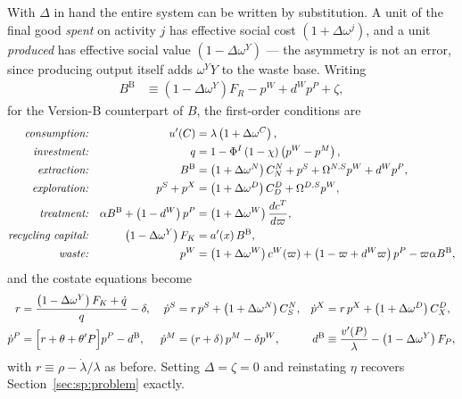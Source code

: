  With $\Delta$ in hand the entire system can be written by substitution.
A unit of the final good \emph{spent} on activity $j$ has effective social cost
$\left(1+\Delta\omega^j\right)$, and a unit \emph{produced} has effective social value
$\left(1-\Delta\omega^Y\right)$ --- the asymmetry is not an error, since producing output itself adds
$\omega^YY$ to the waste base. Writing
\begin{align}
B^{\mathrm B} &\equiv \left(1-\Delta\omega^Y\right)F_R-p^W+d^Wp^P+\zeta,
\label{eq:sp:versions:B-value}
\end{align}
for the Version-B counterpart of $B$, the first-order conditions are
\begin{align}
\text{\emph{consumption:}}
&&
u'\!\left(C\right) &= \lambda\left(1+\Delta\omega^C\right),
\label{eq:sp:versions:foc:C}
\\
\text{\emph{investment:}}
&&
q &= 1-\Phi^I\left(1-\chi\right)\left(p^W-p^M\right),
\label{eq:sp:versions:foc:I}
\\
\text{\emph{extraction:}}
&&
B^{\mathrm B} &= \left(1+\Delta\omega^N\right)C^N_N+p^S+\Omega^{N,S}p^W+d^Wp^P,
\label{eq:sp:versions:foc:N}
\\
\text{\emph{exploration:}}
&&
p^S+p^X &= \left(1+\Delta\omega^D\right)C^D_D+\Omega^{D,S}p^W,
\label{eq:sp:versions:foc:D}
\\
\text{\emph{treatment:}}
&&
\alpha B^{\mathrm B}+\left(1-d^W\right)p^P &= \left(1+\Delta\omega^W\right)\frac{dc^T}{d\varpi},
\label{eq:sp:versions:foc:varpi}
\\
\text{\emph{recycling capital:}}
&&
\left(1-\Delta\omega^Y\right)F_K &= a'\!\left(x\right)B^{\mathrm B},
\label{eq:sp:versions:foc:KR}
\\
\text{\emph{waste:}}
&&
p^W &= \left(1+\Delta\omega^W\right)c^W\!\left(\varpi\right)
+\left(1-\varpi+d^W\varpi\right)p^P-\varpi\alpha B^{\mathrm B},
\label{eq:sp:versions:foc:W}
\end{align}
and the costate equations become
\begin{align}
r &= \frac{\left(1-\Delta\omega^Y\right)F_K+\dot q}{q}-\delta,
&
\dot p^S &= r\,p^S+\left(1+\Delta\omega^N\right)C^N_S,
&
\dot p^X &= r\,p^X+\left(1+\Delta\omega^D\right)C^D_X,
\notag\\
\dot p^P &= \Big[r+\theta+\theta'P\Big]p^P-d^{\mathrm B},
&
\dot p^M &= \left(r+\delta\right)p^M-\delta p^W,
&
d^{\mathrm B}&\equiv\frac{v'\!\left(P\right)}{\lambda}-\left(1-\Delta\omega^Y\right)F_P,
\label{eq:sp:versions:costates}
\end{align}
with $r\equiv\rho-\dot\lambda/\lambda$ as before. Setting $\Delta=\zeta=0$ and reinstating $\eta$
recovers Section~\ref{sec:sp:problem} exactly.

